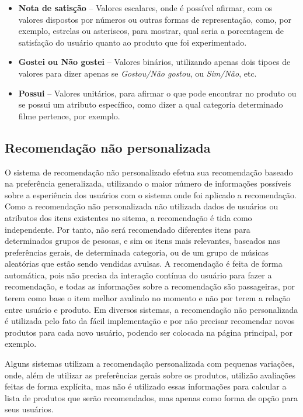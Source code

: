 \documentclass[12pt,
				openright,
				twoside,
				a4paper,
				apter=TITLE,
				section=TITLE,
				subsection=TITLE,
				chapter=TITLE,
				english,
				french,
				spanish,
				brazil]{abntex2}
\begin{document}
\begin{itemize}
\item \textbf{Nota de satisção} – Valores escalares, onde é possível afirmar, com os valores dispostos por números ou outras formas de representação, como, por exemplo, estrelas ou asteriscos, para mostrar, qual seria a porcentagem de satisfação do usuário quanto ao produto que foi experimentado.
\item \textbf{Gostei ou Não gostei} – Valores binários, utilizando apenas dois tipoes de valores para dizer apenas se \textit{Gostou/Não gostou}, ou \textit{Sim/Não}, etc.
\item \textbf{Possui} – Valores unitários, para afirmar o que pode encontrar no produto ou se possui um atributo específico, como dizer a qual categoria determinado filme pertence, por exemplo.
\end{itemize}



\subsection{Recomendação não personalizada}
O sistema de recomendação não personalizado\cite{schafer1999recommender} efetua sua recomendação baseado na preferência generalizada, utilizando o maior número de informações possíveis sobre a esperiência dos usuários com o sistema onde foi aplicado a recomendação. Como a recomendação não personalizada não utilizada dados de usuários ou atributos dos itens existentes no sitema, a recomendação é tida como independente. Por tanto, não será recomendado diferentes itens para determinados grupos de pesosas, e sim os itens mais relevantes, baseados nas preferências gerais, de determinada categoria, ou de um grupo de músicas aleatórias que estão sendo vendidas avulsas. A recomendação é feita de forma automática, pois não precisa da interação contínua do usuário para fazer a recomendação, e todas as informações sobre a recomendação são passageiras, por terem como base o item melhor avaliado no momento e não por terem a relação entre usuário e produto. Em diversos sistemas, a recomendação não personalizada é utilizada pelo fato da fácil implementação e por não precisar recomendar novos produtos para cada novo usuário, podendo ser colocada na página principal, por exemplo.

Alguns sistemas utilizam a recomendação personalizada com pequenas variações, onde, além de utilizar as preferências gerais sobre os produtos, utilizão avaliações feitas de forma explícita, mas não é utilizado essas informações para calcular a lista de produtos que serão recomendados, mas apenas como forma de opção para seus usuários.
\end{document}
